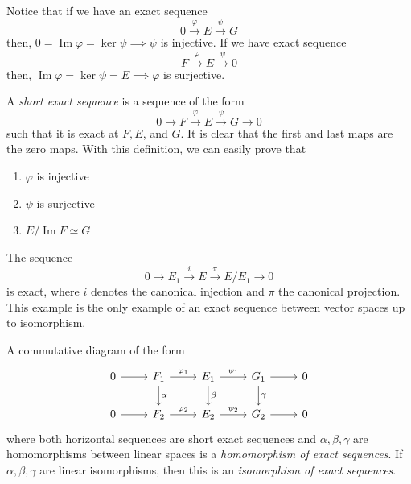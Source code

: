 \documentclass{article}
\DeclareMathOperator{\im}{Im}
\begin{document}
    Notice that if we have an exact sequence 
    \begin{equation}
      0 \xrightarrow{\varphi} E \xrightarrow{\psi} G
    \end{equation}
    then, $0 = \im{\varphi} = \ker{\psi} \implies \psi$ is injective. If we have exact sequence 
    \begin{equation}
      F \xrightarrow{\varphi} E \xrightarrow{\psi} 0
    \end{equation}
    then, $\im{\varphi} = \ker{\psi} = E \implies \varphi$ is surjective. 

    \begin{definition}
      A \textit{short exact sequence} is a sequence of the form
      \begin{equation}
        0 \xrightarrow{} F \xrightarrow{\varphi} E \xrightarrow{\psi} G \xrightarrow{} 0
      \end{equation}
      such that it is exact at $F, E$, and $G$. It is clear that the first and last maps are the zero maps. With this definition, we can easily prove that
      \begin{enumerate}
        \item $\varphi$ is injective
        \item $\psi$ is surjective
        \item $E / \im{F} \simeq G$
      \end{enumerate}
    \end{definition}

    \begin{example}
      The sequence 
      \begin{equation}
        0 \xrightarrow{} E_1 \xrightarrow{i} E \xrightarrow{\pi} E / E_1 \xrightarrow{} 0
      \end{equation}
      is exact, where $i$ denotes the canonical injection and $\pi$ the canonical projection. This example is the only example of an exact sequence between vector spaces up to isomorphism. 
    \end{example}

    \begin{definition}
      A commutative diagram of the form
      \[\begin{tikzcd}
          0 \arrow{r} & F_1 \arrow{d}{\alpha} \arrow{r}{\varphi_1} & E_1 \arrow{d}{\beta} \arrow{r}{\psi_1} & G_1 \arrow{d}{\gamma} \arrow{r} & 0 \\
          0 \arrow{r} & F_2 \arrow{r}{\varphi_2} & E_2 \arrow{r}{\psi_2} & G_2 \arrow{r} & 0 
      \end{tikzcd}\]
      where both horizontal sequences are short exact sequences and $\alpha, \beta, \gamma$ are homomorphisms between linear spaces is a \textit{homomorphism of exact sequences}. If $\alpha, \beta, \gamma$ are linear isomorphisms, then this is an \textit{isomorphism of exact sequences}. 
    \end{definition}
\end{document}
